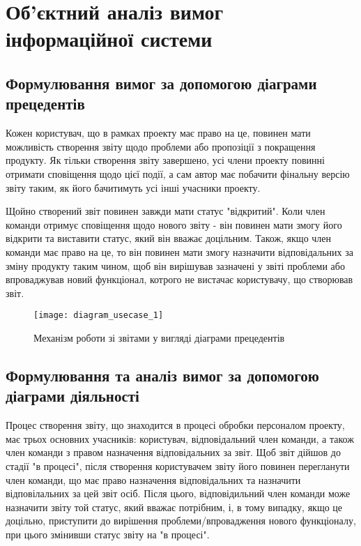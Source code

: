\documentclass[../main.tex]{subfiles}
\begin{document}
\section{Об'єктний аналіз вимог інформаційної системи}

\subsection{Формулювання вимог за допомогою діаграми прецедентів}

Кожен користувач, що в рамках проекту має право на це, повинен мати можливість створення звіту щодо проблеми або пропозіції з покращення продукту. Як тільки створення звіту завершено, усі члени проекту повинні отримати сповіщення щодо цієї події, а сам автор має побачити фінальну версію звіту таким, як його бачитимуть усі інші учасники проекту.

Щойно створений звіт повинен завжди мати статус "відкритий". Коли член команди отримує сповіщення щодо нового звіту - він повинен мати змогу його відкрити та виставити статус, який він вважає доцільним. Також, якщо член команди має право на це, то він повинен мати змогу назначити відповідальних за зміну продукту таким чином, щоб він вирішував зазначені у звіті проблеми або впроваджував новий функціонал, котрого не вистачає користувачу, що створював звіт.

\begin{figure}[H]
\centering
\texttt{[image: diagram\_usecase\_1]}
\caption{Механізм роботи зі звітами у вигляді діаграми прецедентів}
\end{figure}

\subsection{Формулювання та аналіз вимог за допомогою діаграми діяльності}

Процес створення звіту, що знаходится в процесі обробки персоналом проекту, має трьох основних учасників: користувач, відповідальний член команди, а також член команди з правом назначення відповідальних за звіт. Щоб звіт дійшов до стадії "в процесі", після створення користувачем звіту його повинен перегланути член команди, що має право назначення відповідальних та назначити відповілальних за цей звіт осіб. Після цього, відповідильний член команди може назначити звіту той статус, який вважає потрібним, і, в тому випадку, якщо це доцільно, приступити до вирішення проблеми/впровадження нового функціоналу, при цього змінивши статус звіту на "в процесі".
\end{document}
